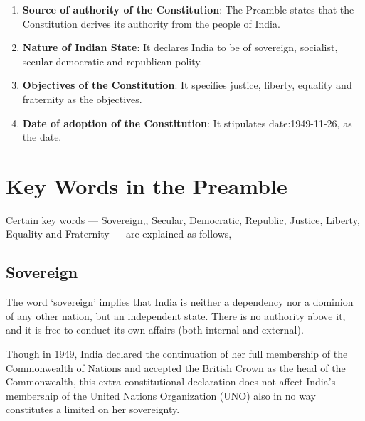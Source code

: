 \begin{enumerate}
  \item \textbf{Source of authority of the Constitution}: The Preamble states that the Constitution derives its authority from the people of India.
  \item \textbf{Nature of Indian State}: It declares India to be of sovereign, socialist, secular democratic and republican polity.
  \item \textbf{Objectives of the Constitution}: It specifies justice, liberty, equality and fraternity as the objectives.
  \item \textbf{Date of adoption of the Constitution}: It stipulates \gls{date:1949-11-26}, as the date.
\end{enumerate}


\section{Key Words in the Preamble}

Certain key words — Sovereign,, Secular, Democratic, Republic, Justice, Liberty, Equality and Fraternity — are explained as follows,

\subsection{Sovereign}

The word `sovereign' implies that India is neither a dependency nor a dominion of any other nation, but an independent state. There is no authority above it, and it is free to conduct its own affairs (both internal and external).

Though in 1949, India declared the continuation of her full membership of the Commonwealth of Nations and accepted the British Crown as the head of the Commonwealth, this extra-constitutional declaration does not affect India's membership of the United Nations Organization (UNO) also in no way constitutes a limited on her sovereignty.

